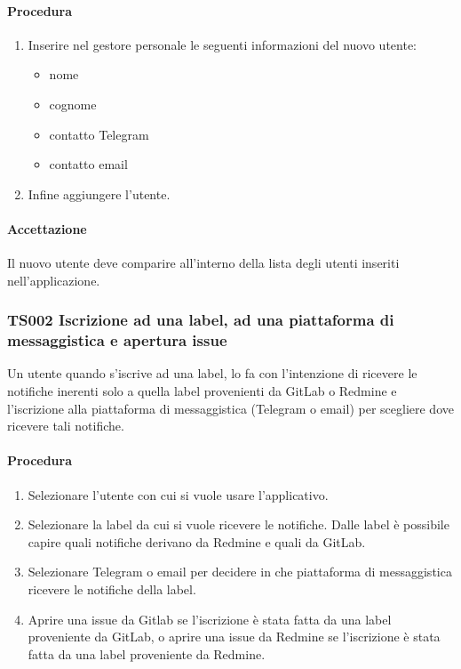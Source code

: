 		\paragraph*{Procedura}
			\begin{enumerate}
				\item Inserire nel gestore personale le seguenti informazioni del nuovo utente:
				\begin{itemize}
					\item nome
					\item cognome
					\item contatto Telegram
					\item contatto email
				\end{itemize}
				
				\item Infine aggiungere l'utente.
			\end{enumerate}
	
		\paragraph*{Accettazione}
		Il nuovo utente deve comparire all'interno della lista degli utenti inseriti nell'applicazione.
	
	\subsubsection{TS002 Iscrizione ad una label, ad una piattaforma di messaggistica e apertura issue}
		Un utente quando s'iscrive ad una label, lo fa con l'intenzione di ricevere le notifiche inerenti solo a quella label provenienti da GitLab o Redmine e l'iscrizione alla piattaforma di messaggistica (Telegram o email) per scegliere dove ricevere tali notifiche.
		
		\paragraph*{Procedura}
			\begin{enumerate}
				\item Selezionare l'utente con cui si vuole usare l'applicativo.
				\item Selezionare la label da cui si vuole ricevere le notifiche. Dalle label è possibile capire quali notifiche derivano da Redmine e quali da GitLab.
				\item Selezionare Telegram o email per decidere in che piattaforma di messaggistica ricevere le notifiche della label.
				\item Aprire una issue da Gitlab se l'iscrizione è stata fatta da una label proveniente da GitLab, o aprire una issue da Redmine se l'iscrizione è stata fatta da una label proveniente da Redmine.
			\end{enumerate}
		
